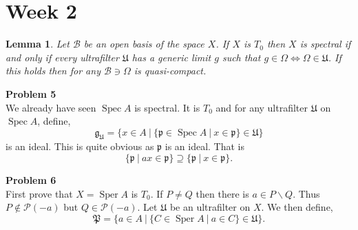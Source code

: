 \documentclass[10pt]{article}
\numberwithin{equation}{section}
\newtheorem{lemma}{Lemma}[section]
\DeclareMathOperator{\Spec}{Spec}
\DeclareMathOperator{\Sper}{Sper}
\newcommand{\U}[0]{\mathfrak{U}}
\newcommand{\sep}[0]{\:|\:}
\newcommand{\g}[0]{\mathfrak{g}}
\newcommand{\p}[0]{\mathfrak{p}}
\begin{document}
 \section{Week 2}
  \begin{lemma}
  Let $\mathcal{B}$ be an open basis of the space $X$. If $X$ is $T_0$ then $X$ is spectral if and only if every ultrafilter $\U$ has a generic limit $g$ such that $g\in \Omega\Leftrightarrow \Omega\in \U$.
  If this holds then for any $\mathcal{B}\ni\Omega$ is quasi-compact.
 \end{lemma}
 \par\textbf{Problem 5}\\
 We already have seen $\Spec A$ is spectral. It is $T_0$ and for any ultrafilter $\U$ on $\Spec A$, define,
 \begin{equation*}
  \g_\U = \{x\in A\sep \{\p \in\Spec A\sep x\in \p\}\in\U\}
 \end{equation*}
 is an ideal. This is quite obvious as $\p$ is an ideal. That is 
 \begin{equation*}
  \{\p\sep ax\in\p\}\supseteq\{\p\sep x\in \p\}.
 \end{equation*}
 \par\textbf{Problem 6}\\
 First prove that $X=\Sper A$ is $T_0$. If $P\not=Q$ then there is $a\in P\backslash Q$. Thus $P\not\in\mathcal{P}(-a)$ but $Q\in\mathcal{P}(-a)$. Let $\U$ be an ultrafilter on $X$. We then define,
 \begin{equation*}
  \mathfrak{P} = \{a\in A\sep \{C\in\Sper A\sep a\in C\}\in\U\}.
 \end{equation*}
\end{document}
